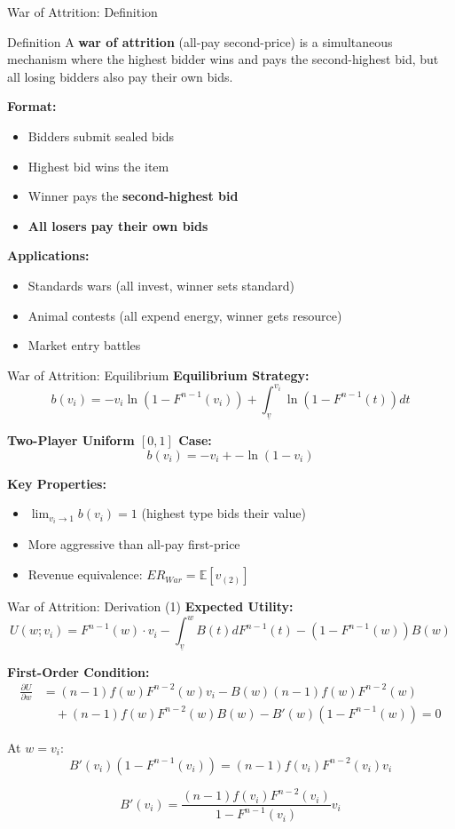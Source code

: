 \documentclass[xcolor={x11names}, aspectratio=169 ]{beamer}
\newcommand{\E}{\mathbb{E}}
\begin{document}
\begin{frame}{War of Attrition: Definition}
\begin{block}{Definition}
A \textbf{war of attrition} (all-pay second-price) is a simultaneous mechanism where the highest bidder wins and pays the second-highest bid, but all losing bidders also pay their own bids.
\end{block}

\textbf{Format:}
\begin{itemize}
\item Bidders submit sealed bids
\item Highest bid wins the item
\item Winner pays the \textbf{second-highest bid}
\item \textbf{All losers pay their own bids}
\end{itemize}

\textbf{Applications:}
\begin{itemize}
  \item Standards wars (all invest, winner sets standard)
  \item Animal contests (all expend energy, winner gets resource)
  \item Market entry battles
\end{itemize}
\end{frame}

\begin{frame}{War of Attrition: Equilibrium}
\textbf{Equilibrium Strategy:}
$$b(v_i) = -v_i \ln(1 - F^{n-1}(v_i)) + \int_{\underline{v}}^{v_i} \ln(1 - F^{n-1}(t))dt$$

\textbf{Two-Player Uniform $[0,1]$ Case:}
$$\boxed{b(v_i) = -v_i + - \ln(1-v_i)}$$

\textbf{Key Properties:}
\begin{itemize}
  \item $\lim_{v_i \to 1} b(v_i) = 1$ (highest type bids their value)
  \item More aggressive than all-pay first-price
  \item Revenue equivalence: $ER_{War} = \E[v_{(2)}]$
\end{itemize}
\end{frame}

\begin{frame}{War of Attrition: Derivation (1)}
\textbf{Expected Utility:}
$$U(w; v_i) = F^{n-1}(w) \cdot v_i - \int_{\underline{v}}^w B(t) dF^{n-1}(t) - (1-F^{n-1}(w))B(w)$$

\textbf{First-Order Condition:}
\begin{align*}
\frac{\partial U}{\partial w} &= (n-1)f(w)F^{n-2}(w)v_i - B(w)(n-1)f(w)F^{n-2}(w) \\
&\quad + (n-1)f(w)F^{n-2}(w)B(w) - B'(w)(1-F^{n-1}(w)) = 0
\end{align*}

At $w = v_i$:
$$B'(v_i)(1-F^{n-1}(v_i)) = (n-1)f(v_i)F^{n-2}(v_i)v_i$$

$$B'(v_i) = \frac{(n-1)f(v_i)F^{n-2}(v_i)}{1-F^{n-1}(v_i)} v_i$$
\end{frame}
\end{document}
